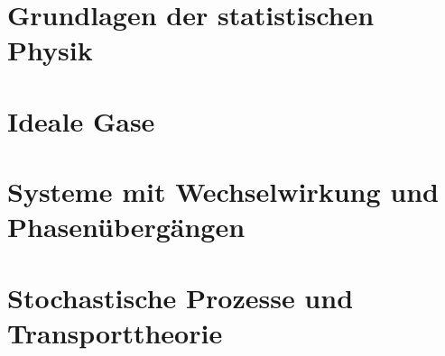 \documentclass[a4paper,11pt]{scrartcl}
\begin{document}
\section{Grundlagen der statistischen Physik}
\section{Ideale Gase}
\section{Systeme mit Wechselwirkung und Phasenübergängen}
\section{Stochastische Prozesse und Transporttheorie}
\end{document}
